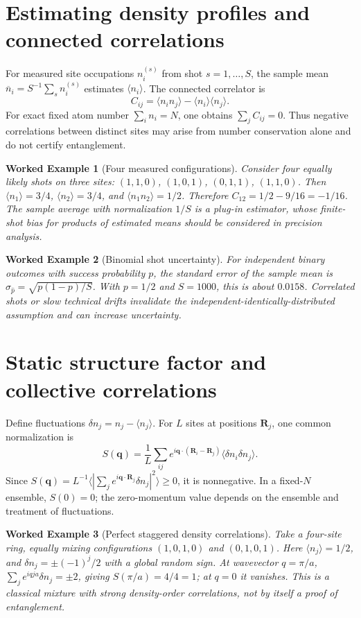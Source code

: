 \documentclass[11pt,a4paper]{article}
\newtheorem{example}{Worked Example}
\begin{document}
\section{Estimating density profiles and connected correlations}
For measured site occupations $n_i^{(s)}$ from shot $s=1,\ldots,S$, the sample mean $\overline n_i=S^{-1}\sum_s n_i^{(s)}$ estimates $\langle n_i\rangle$. The connected correlator is
\begin{equation}C_{ij}=\langle n_i n_j\rangle-\langle n_i\rangle\langle n_j\rangle.\label{eq:cij}\end{equation}
For exact fixed atom number $\sum_i n_i=N$, one obtains $\sum_j C_{ij}=0$. Thus negative correlations between distinct sites may arise from number conservation alone and do not certify entanglement.
\begin{example}[Four measured configurations]
Consider four equally likely shots on three sites: $(1,1,0)$, $(1,0,1)$, $(0,1,1)$, $(1,1,0)$. Then $\langle n_1\rangle=3/4$, $\langle n_2\rangle=3/4$, and $\langle n_1n_2\rangle=1/2$. Therefore $C_{12}=1/2-9/16=-1/16$. The sample average with normalization $1/S$ is a plug-in estimator, whose finite-shot bias for products of estimated means should be considered in precision analysis.
\end{example}
\begin{example}[Binomial shot uncertainty]
For independent binary outcomes with success probability $p$, the standard error of the sample mean is $\sigma_{\widehat p}=\sqrt{p(1-p)/S}$. With $p=1/2$ and $S=1000$, this is about $0.0158$. Correlated shots or slow technical drifts invalidate the independent-identically-distributed assumption and can increase uncertainty.
\end{example}
\section{Static structure factor and collective correlations}
Define fluctuations $\delta n_j=n_j-\langle n_j\rangle$. For $L$ sites at positions $\mathbf R_j$, one common normalization is
\begin{equation}S(\mathbf q)=\frac{1}{L}\sum_{ij}e^{i\mathbf q\cdot(\mathbf R_i-\mathbf R_j)}\langle\delta n_i\delta n_j\rangle.\label{eq:sq}\end{equation}
Since $S(\mathbf q)=L^{-1}\langle|\sum_j e^{i\mathbf q\cdot\mathbf R_j}\delta n_j|^2\rangle\ge0$, it is nonnegative. In a fixed-$N$ ensemble, $S(0)=0$; the zero-momentum value depends on the ensemble and treatment of fluctuations.
\begin{example}[Perfect staggered density correlations]
Take a four-site ring, equally mixing configurations $(1,0,1,0)$ and $(0,1,0,1)$. Here $\langle n_j\rangle=1/2$, and $\delta n_j=\pm(-1)^j/2$ with a global random sign. At wavevector $q=\pi/a$, $\sum_j e^{iqja}\delta n_j=\pm2$, giving $S(\pi/a)=4/4=1$; at $q=0$ it vanishes. This is a classical mixture with strong density-order correlations, not by itself a proof of entanglement.
\end{example}
\end{document}
